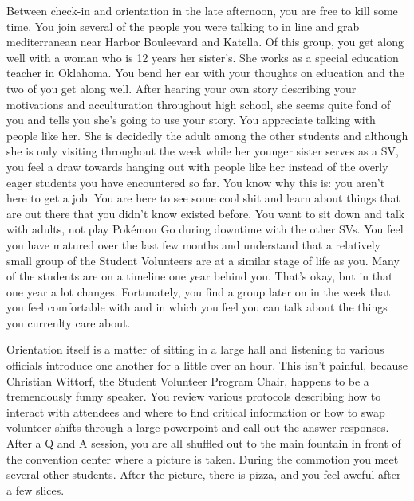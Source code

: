 \documentclass[../main.tex]{subfiles}
\begin{document}
Between check-in and orientation in the late afternoon, you are free to kill some time. You join several of the people you were talking to in line and grab mediterranean near Harbor Bouleevard and Katella. Of this group, you get along well with a woman who is 12 years her sister's. She works as a special education teacher in Oklahoma. You bend her ear with your thoughts on education and the two of you get along well. After hearing your own story describing your motivations and acculturation throughout high school, she seems quite fond of you and tells you she's going to use your story. You appreciate talking with people like her. She is decidedly the adult among the other students and although she is only visiting throughout the week while her younger sister serves as a SV, you feel a draw towards hanging out with people like her instead of the overly eager students you have encountered so far. You know why this is: you aren't here to get a job. You are here to see some cool shit and learn about things that are out there that you didn't know existed before. You want to sit down and talk with adults, not play Pokémon Go during downtime with the other SVs. You feel you have matured over the last few months and understand that a relatively small group of the Student Volunteers are at a similar stage of life as you. Many of the students are on a timeline one year behind you. That's okay, but in that one year a lot changes. Fortunately, you find a group later on in the week that you feel comfortable with and in which you feel you can talk about the things you currenlty care about.

Orientation itself is a matter of sitting in a large hall and listening to various officials introduce one another for a little over an hour. This isn't painful, because Christian Wittorf, the Student Volunteer Program Chair, happens to be a tremendously funny speaker. You review various protocols describing how to interact with attendees and where to find critical information or how to swap volunteer shifts through a large powerpoint and call-out-the-answer responses. After a Q and A session, you are all shuffled out to the main fountain in front of the convention center where a picture is taken. During the commotion you meet several other students. After the picture, there is pizza, and you feel aweful after a few slices.
\end{document}
